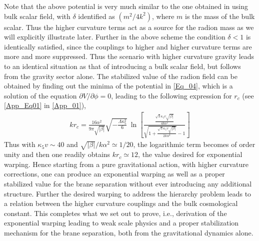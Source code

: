 \documentclass{article}
\begin{document}
Note that the above potential is very much similar to the one obtained in \cite{Goldberger:1999uk,Goldberger:1999un} using bulk scalar field, with $\delta$ identified as $(m^{2}/4k^{2})$, where $m$ is the mass of the bulk scalar. Thus the higher curvature terms act as a source for the radion mass as we will explicitly illustrate later. Further in the above scheme the condition $\delta <1$ is identically satisfied, since the couplings to higher and higher curvature terms are more and more suppressed. Thus the scenario with higher curvature gravity leads to an identical situation as that of introducing a bulk scalar field, but follows from the gravity sector alone. The stabilized value of the radion field can be obtained by finding out the minima of the potential in \ref{Eq_04}, which is a solution of the equation $\partial V/\partial \phi =0$, leading to the following expression for $r_{c}$ (see \ref{App_Eq01} in \ref{App_01}),
\begin{align}\label{Eq_05}
kr_{c}=\frac{16\alpha ^{2}}{9 \pi \sqrt{|\beta|}}\sqrt{-\frac{\Lambda \kappa _{5}^{2}}{6}}~
\ln \left[\frac{\frac{\sqrt{3}\kappa _{5}v\sqrt{|\beta|}}{4k\alpha ^{2}}}{\sqrt{1+\frac{\sqrt{3}\kappa _{5}v\sqrt{|\beta|}}{2k\alpha ^{2}}}-1}\right]
\end{align}
Thus with $\kappa _{5}v \sim 40$ and $\sqrt{|\beta|}/k\alpha ^{2}\simeq 1/20$, the logarithmic term becomes of order unity and then one readily obtains $kr_{c}\simeq 12$, the value desired for exponential warping. Hence starting from a pure gravitational action, with higher curvature corrections, one can produce an exponential warping as well as a proper stabilized value for the brane separation without ever introducing any additional structure. Further the desired warping to address the hierarchy problem leads to a relation between the higher curvature couplings and the bulk cosmological constant. This completes what we set out to prove, i.e., derivation of the exponential warping leading to weak scale physics and a proper stabilization mechanism for the brane separation, both from the gravitational dynamics alone. 
\end{document}
